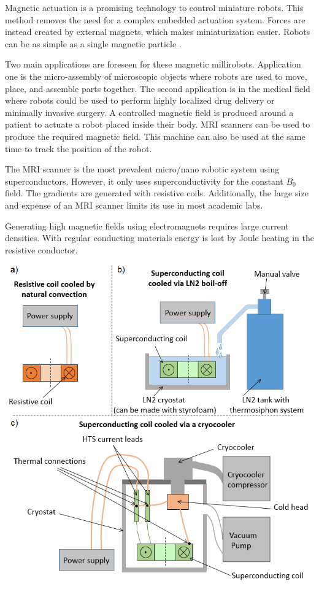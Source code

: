 \documentclass{ws-jmrr}
\begin{document}
\begin{multicols}{2}
Magnetic actuation is a promising technology to control miniature robots. This method removes the need for a complex embedded actuation system. Forces are instead created by external magnets, which makes miniaturization easier. Robots can be as simple as a single magnetic particle \cite{sitti2015biomedical}.\par
Two main applications are foreseen for these magnetic millirobots. Application one is the micro-assembly of microscopic objects where robots are used to move, place, and assemble parts together. The second application is in the medical field where robots could be used to perform highly localized drug delivery or minimally invasive surgery. A controlled magnetic field is produced around a patient to actuate a robot placed inside their body. MRI scanners can be used to produce the required magnetic field. This machine can also be used at the same time to track the position of the robot.\par
The MRI scanner is the most prevalent micro/nano robotic system using superconductors. However, it only uses superconductivity for the constant $B_0$ field. The gradients are generated with resistive coils.  Additionally, the large size and expense of an MRI scanner limits its use in most academic labs.\par
Generating high magnetic fields using electromagnets requires large current densities. With regular conducting materials energy is lost by Joule heating in the resistive conductor.
\begin{figurehere}
\begin{center}
	\includegraphics[width=\linewidth]{fig_system_v2.png}

\end{center}
\end{figurehere}
\end{multicols}
\end{document}
